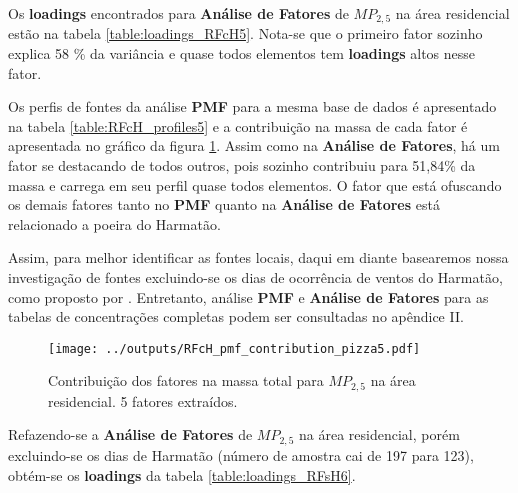 Os \textbf{loadings} encontrados para \textbf{Análise de Fatores} de $MP_{2,5}$
na área residencial estão na tabela \ref{table:loadings_RFcH5}. 
Nota-se que o primeiro fator sozinho explica 58 \% da variância e quase todos 
elementos tem \textbf{loadings} altos nesse fator. 

\begin{table}[H]
  
  \caption{Análise de Fatores para $MP_{2,5}$ na região residencial.
           Rotação varimax - 5 fatores retidos (n=197).
           (\textcolor{red}{h} : Comunalidade; 
           \textcolor{red}{S=1-h} : Singularidade; 
           \textcolor{red}{C} : Complexidade.)
           \label{table:loadings_RFcH5}}
\end{table}

Os perfis de fontes da análise \textbf{PMF} para a mesma base de dados é 
apresentado na tabela \ref{table:RFcH_profiles5} e a contribuição na massa
de cada fator é apresentada no gráfico da figura \ref{table:RFcH_contribution5}.
Assim como na \textbf{Análise de Fatores}, há um fator se destacando de todos
outros, pois sozinho contribuiu para 51,84\% da massa e carrega em seu perfil
quase todos elementos. O fator que está ofuscando os demais fatores
tanto no \textbf{PMF} quanto na \textbf{Análise de Fatores} está relacionado
a poeira do Harmatão.
 
Assim, para melhor identificar as fontes locais, daqui em diante basearemos 
nossa investigação de fontes excluindo-se os dias de ocorrência de ventos do 
Harmatão, como proposto por \cite{aboh2009}. Entretanto, análise \textbf{PMF} e 
\textbf{Análise de Fatores} para as tabelas de concentrações completas podem
ser consultadas no apêndice II. 

\begin{figure}[H]
\centering
  \texttt{[image: ../outputs/RFcH\_pmf\_contribution\_pizza5.pdf]}
  \caption{Contribuição dos fatores na massa total para $MP_{2,5}$ na área
           residencial. 5 fatores extraídos.
          \label{table:RFcH_contribution5}}
\end{figure}

\begin{table}[H]
  \centering
    
    \caption{Perfis do fatores na área residencial $MP_{2,5}$ 
             (seed=123, n= 197). 
             \label{table:RFcH_profiles5}}
\end{table}

Refazendo-se a \textbf{Análise de Fatores} de $MP_{2,5}$ na área residencial, 
porém excluindo-se os dias de Harmatão (número de amostra cai de 197 para 123), 
obtém-se os \textbf{loadings} da tabela \ref{table:loadings_RFsH6}. 

